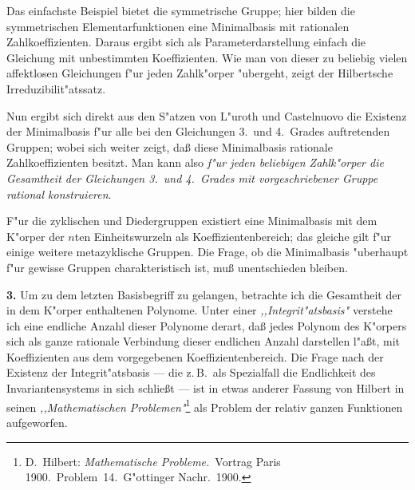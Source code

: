 \documentclass[11pt,a4paper]{article}
\begin{document}
Das einfachste Beispiel bietet die symmetrische Gruppe; hier bilden
die symmetrischen Elementarfunktionen eine Minimalbasis mit rationalen
Zahlkoeffizienten. Daraus ergibt sich als Parameterdarstellung einfach
die Gleichung mit unbestimmten Koeffizienten. Wie man von dieser
zu beliebig vielen affektlosen Gleichungen f"{u}r jeden Zahlk"{o}rper "{u}bergeht,
zeigt der Hilbertsche Irreduzibilit"{a}tssatz.

Nun ergibt sich direkt aus den S"{a}tzen von L"{u}roth und Castelnuovo
die Existenz der Minimalbasis f"{u}r alle bei den Gleichungen 3.\ und
4.\ Grades auftretenden Gruppen; wobei sich weiter zeigt, da\ss{} diese
Minimalbasis rationale Zahlkoeffizienten besitzt. Man kann also \emph{f"{u}r jeden
beliebigen Zahlk"{o}rper die Gesamtheit der Gleichungen 3.\ und 4.\ Grades
mit vorgeschriebener Gruppe rational konstruieren}.

F"{u}r die zyklischen und Diedergruppen existiert eine Minimalbasis mit
dem K"{o}rper der $n$ten Einheitswurzeln als Koeffizientenbereich; das
gleiche gilt f"{u}r einige weitere metazyklische Gruppen. Die Frage, ob
die Minimalbasis "{u}berhaupt f"{u}r gewisse Gruppen charakteristisch ist,
mu\ss{} unentschieden bleiben.

\smallskip
\noindent
\textbf{3.} Um zu dem letzten Basisbegriff zu gelangen, betrachte ich die
Gesamtheit der in dem K"{o}rper enthaltenen Polynome. Unter einer
\emph{,,Integrit"{a}tsbasis"{}} verstehe ich eine endliche Anzahl dieser Polynome
derart, da\ss{} jedes Polynom des K"{o}rpers sich als ganze rationale Verbindung
dieser endlichen Anzahl darstellen l"{a}\ss{}t, mit Koeffizienten aus
dem vorgegebenen Koeffizientenbereich. Die Frage nach der Existenz
der Integrit"{a}tsbasis --- die z.\,B.\ als Spezialfall die Endlichkeit des
Invariantensystems in sich schlie\ss{}t --- ist in etwas anderer Fassung von
Hilbert in seinen \emph{,,Mathematischen Problemen"{}}\footnote{D.\ Hilbert:
\emph{Mathematische Probleme.}\ Vortrag Paris 1900.\ Problem~14.\ G"{o}ttinger
Nachr.\ 1900.} als Problem der relativ ganzen Funktionen aufgeworfen.
\end{document}
